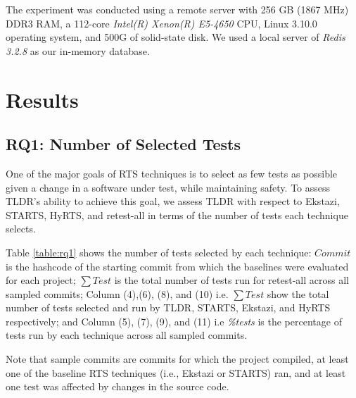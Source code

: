 The experiment was conducted using a remote server with 256 GB (1867 MHz) DDR3 RAM, a 112-core \textit{Intel(R) Xenon(R) E5-4650} CPU, Linux 3.10.0 operating system, and 500G of solid-state disk. We used a local server of \textit{Redis 3.2.8} as our in-memory database. 





\section{Results}

\subsection{RQ1: Number of Selected Tests}

One of the major goals of RTS techniques is to select as few tests as possible given a change in a software under test, while maintaining safety. To assess TLDR's ability to achieve this goal, we assess TLDR with respect to Ekstazi, STARTS, HyRTS, and retest-all in terms of the number of tests each technique selects. 

Table \ref{table:rq1} shows the number of tests selected by each technique: $Commit$ is the hashcode of the starting commit from which the baselines were evaluated for each project; $\sum Test$ is the total number of tests run for retest-all across all sampled commits; Column (4),(6), (8), and (10) i.e. $\sum Test$ show the total number of tests selected and run by TLDR, STARTS, Ekstazi, and HyRTS respectively; and Column (5), (7), (9), and (11) i.e \textit{\%tests} is the percentage of tests run by each technique across all sampled commits. 
 
Note that sample commits are commits for which the project compiled, at least one of the baseline RTS techniques (i.e., Ekstazi or STARTS) ran, and at least one test was affected by changes in the source code. 

